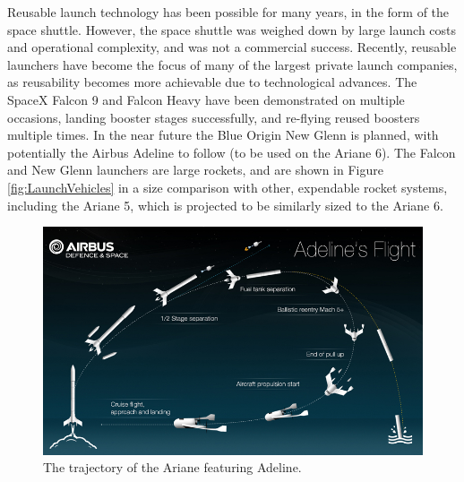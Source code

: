     
    Reusable launch technology has been possible for many years, in the form of the space shuttle. However, the space shuttle was weighed down by large launch costs and operational complexity, and was not a commercial success\cite{Launius2006}. Recently, reusable launchers have become the focus of many of the largest private launch companies, as reusability becomes more achievable due to technological advances\cite{Foust2018,Mosher2018}. The SpaceX Falcon 9 and Falcon Heavy have been demonstrated on multiple occasions, landing booster stages successfully, and re-flying reused boosters multiple times\cite{Foust2018}. In the near future the Blue Origin New Glenn is planned\cite{Foust2018}, with potentially the Airbus Adeline to follow (to be used on the Ariane 6)\cite{Adeline}. The Falcon and New Glenn launchers are large rockets, and are shown in Figure \ref{fig:LaunchVehicles} in a size comparison with other, expendable rocket systems, including the Ariane 5, which is projected to be similarly sized to the Ariane 6. 
     

    
    
    
    
    
    \begin{figure}[ht]
    	\centering
    	\includegraphics[width=0.7\linewidth]{figures/2_literature-review/visuel_adeline1}
    	\caption{The trajectory of the Ariane featuring Adeline\cite{Adelineb}.}
    	\label{fig:visuel_adeline1}
    \end{figure}
    
